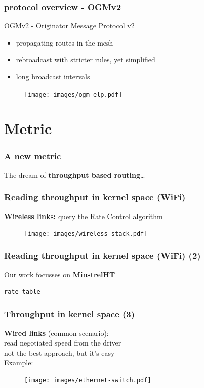 \documentclass[slidestop]{beamer}
\begin{document}
\begin{frame}[c]
	\frametitle{protocol overview - OGMv2}

	OGMv2 - Originator Message Protocol v2
	\begin{itemize}
		\item propagating routes in the mesh
		\item rebroadcast with stricter rules, yet simplified
		\item long broadcast intervals
	\end{itemize}

	\begin{figure}
		\centering
		\texttt{[image: images/ogm-elp.pdf]}
	\end{figure}
\end{frame}

\section{Metric}
\begin{frame}[c]
	\frametitle{A new metric}
	\begin{center}
		The dream of \textbf{throughput based routing}\dots
	\end{center}
\end{frame}

\begin{frame}[c]
	\frametitle{Reading throughput in kernel space (WiFi)}
	\textbf{Wireless links:} query the Rate Control algorithm
	\vfill
	\begin{figure}
		\centering
		\texttt{[image: images/wireless-stack.pdf]}
	\end{figure}
\end{frame}

\begin{frame}[c,fragile]
	\frametitle{Reading throughput in kernel space (WiFi) (2)}
	Our work focusses on \textbf{MinstrelHT}\\[0.5cm]
	\begin{lstlisting}[basicstyle=tiny]
	rate table
	\end{lstlisting}
\end{frame}

\begin{frame}[c]
	\frametitle{Throughput in kernel space (3)}
	\begin{center}
	\textbf{Wired links} (common scenario):\\
	read negotiated speed from the driver\\[0.5cm]
	\pause
	not the best approach, but it's easy\\[0.3cm]
	Example:
	\begin{figure}
		\centering
		\texttt{[image: images/ethernet-switch.pdf]}
	\end{figure}
	\end{center}
\end{frame}
\end{document}
